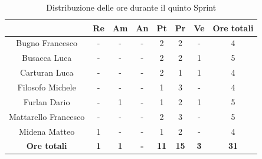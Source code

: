 \begin{table}[H]
  \centering
  \renewcommand{\arraystretch}{1.8}
  \begin{tabular}{c|c|c|c|c|c|c|c}
    \rowcolor[HTML]{125E28}
    \multicolumn{1}{c}{\color[HTML]{FFFFFF}\textbf{ Nominativo }}
                         & \multicolumn{1}{c}{\color[HTML]{FFFFFF}\textbf{ Re }}
                         & \multicolumn{1}{c}{\color[HTML]{FFFFFF}\textbf{ Am}}
                         & \multicolumn{1}{c}{\color[HTML]{FFFFFF}\textbf{ An }}
                         & \multicolumn{1}{c}{\color[HTML]{FFFFFF}\textbf{ Pt }}
                         & \multicolumn{1}{c}{\color[HTML]{FFFFFF}\textbf{ Pr }}
                         & \multicolumn{1}{c}{\color[HTML]{FFFFFF}\textbf{ Ve }}
                         & \multicolumn{1}{c}{\color[HTML]{FFFFFF}\textbf{ Ore totali }}                                                                                  \\
    \hline
    Bugno Francesco      & -                                                             & -          & -          & 2           & 2           & -          & 4           \\
    Busacca Luca         & -                                                             & -          & -          & 2           & 2           & 1          & 5           \\
    Carturan Luca        & -                                                             & -          & -          & 2           & 1           & 1          & 4           \\
    Filosofo Michele     & -                                                             & -          & -          & 1           & 3           & -          & 4           \\
    Furlan Dario         & -                                                             & 1          & -          & 1           & 2           & 1          & 5           \\
    Mattarello Francesco & -                                                             & -          & -          & 2           & 3           & -          & 5           \\
    Midena Matteo        & 1                                                             & -          & -          & 1           & 2           & -          & 4           \\
    \textbf{Ore totali}  & \textbf{1}                                                    & \textbf{1} & \textbf{-} & \textbf{11} & \textbf{15} & \textbf{3} & \textbf{31}
  \end{tabular}
  \caption{Distribuzione delle ore durante il quinto Sprint}
\end{table}


